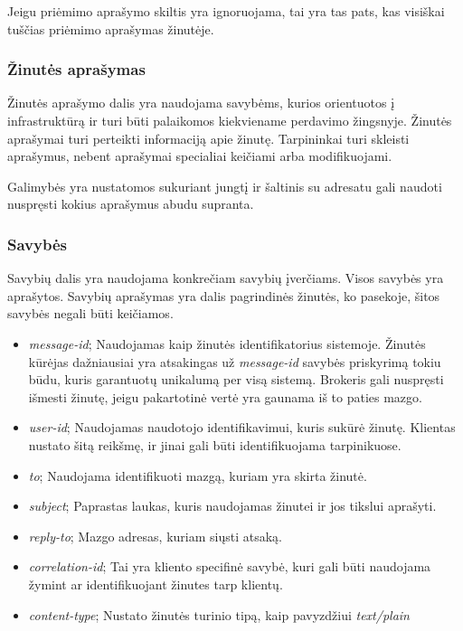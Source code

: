\documentclass[12pt, a4paper, lithuanian]{article}
\begin{document}
        Jeigu priėmimo aprašymo skiltis yra ignoruojama, tai yra tas pats, kas visiškai tuščias priėmimo aprašymas žinutėje.

    \subsubsection{Žinutės aprašymas}

        Žinutės aprašymo dalis yra naudojama savybėms, kurios orientuotos į infrastruktūrą ir turi būti palaikomos kiekviename perdavimo žingsnyje.
        Žinutės aprašymai turi perteikti informaciją apie žinutę.
        Tarpininkai turi skleisti aprašymus, nebent aprašymai specialiai keičiami arba modifikuojami.

        Galimybės yra nustatomos sukuriant jungtį ir šaltinis su adresatu gali naudoti nuspręsti kokius aprašymus abudu supranta.

    \subsubsection{Savybės}

        Savybių dalis yra naudojama konkrečiam savybių įverčiams. Visos savybės yra aprašytos.
        Savybių aprašymas yra dalis pagrindinės žinutės, ko pasekoje, šitos savybės negali būti keičiamos.

        \begin{itemize}
            \item \textit{message-id}; Naudojamas kaip žinutės identifikatorius sistemoje. Žinutės kūrėjas dažniausiai yra atsakingas už \textit{message-id} savybės priskyrimą tokiu būdu, kuris garantuotų unikalumą per visą sistemą.
            Brokeris gali nuspręsti išmesti žinutę, jeigu pakartotinė vertė yra gaunama iš to paties mazgo.
            \item \textit{user-id}; Naudojamas naudotojo identifikavimui, kuris sukūrė žinutę. Klientas nustato šitą reikšmę, ir jinai gali būti identifikuojama tarpinikuose.
            \item \textit{to}; Naudojama identifikuoti mazgą, kuriam yra skirta žinutė. 
            \item \textit{subject}; Paprastas laukas, kuris naudojamas žinutei ir jos tikslui aprašyti.
            \item \textit{reply-to}; Mazgo adresas, kuriam siųsti atsaką.
            \item \textit{correlation-id}; Tai yra kliento specifinė savybė, kuri gali būti naudojama žymint ar identifikuojant žinutes tarp klientų.
            \item \textit{content-type}; Nustato žinutės turinio tipą, kaip pavyzdžiui \textit{text/plain}
        \end{itemize}
\end{document}
